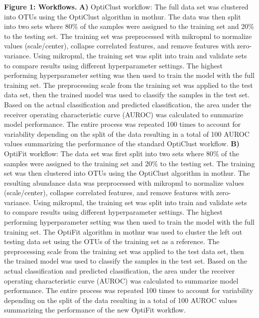 \documentclass[
]{article}
\begin{document}
\textbf{Figure 1: Workflows.} \textbf{A)} OptiClust workflow: The full
data set was clustered into OTUs using the OptiClust algorithm in
mothur. The data was then split into two sets where 80\% of the samples
were assigned to the training set and 20\% to the testing set. The
training set was preprocessed with mikropml to normalize values
(scale/center), collapse correlated features, and remove features with
zero-variance. Using mikropml, the training set was split into train and
validate sets to compare results using different hyperparameter
settings. The highest performing hyperparameter setting was then used to
train the model with the full training set. The preprocessing scale from
the training set was applied to the test data set, then the trained
model was used to classify the samples in the test set. Based on the
actual classification and predicted classification, the area under the
receiver operating characteristic curve (AUROC) was calculated to
summarize model performance. The entire process was repeated 100 times
to account for variability depending on the split of the data resulting
in a total of 100 AUROC values summarizing the performance of the
standard OptiClust workflow. \textbf{B)} OptiFit workflow: The data set
was first split into two sets where 80\% of the samples were assigned to
the training set and 20\% to the testing set. The training set was then
clustered into OTUs using the OptiClust algorithm in mothur. The
resulting abundance data was preprocessed with mikropml to normalize
values (scale/center), collapse correlated features, and remove features
with zero-variance. Using mikropml, the training set was split into
train and validate sets to compare results using different
hyperparameter settings. The highest performing hyperparameter setting
was then used to train the model with the full training set. The OptiFit
algorithm in mothur was used to cluster the left out testing data set
using the OTUs of the training set as a reference. The preprocessing
scale from the training set was applied to the test data set, then the
trained model was used to classify the samples in the test set. Based on
the actual classification and predicted classification, the area under
the receiver operating characteristic curve (AUROC) was calculated to
summarize model performance. The entire process was repeated 100 times
to account for variability depending on the split of the data resulting
in a total of 100 AUROC values summarizing the performance of the new
OptiFit workflow.

\newpage
\end{document}
